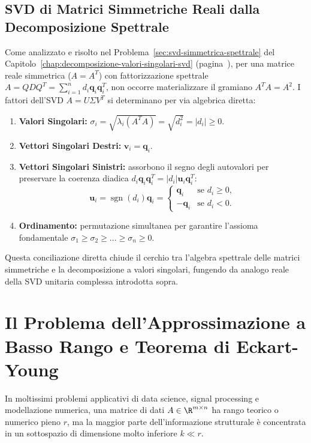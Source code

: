 \subsection{SVD di Matrici Simmetriche Reali dalla Decomposizione Spettrale}
\label{sec:svd-simmetriche-recap}

Come analizzato e risolto nel Problema~\ref{sec:svd-simmetrica-spettrale} del Capitolo~\ref{chap:decomposizione-valori-singolari-svd} (pagina~\pageref{sec:svd-simmetrica-spettrale}), per una matrice reale simmetrica ($A = A^T$) con fattorizzazione spettrale $A = Q D Q^T = \sum_{i=1}^n d_i \mathbf{q}_i \mathbf{q}_i^T$, non occorre materializzare il gramiano $A^T A = A^2$. I fattori dell'SVD $A = U \Sigma V^T$ si determinano per via algebrica diretta:
\begin{enumerate}
    \item \textbf{Valori Singolari:} $\sigma_i = \sqrt{\lambda_i(A^T A)} = \sqrt{d_i^2} = |d_i| \ge 0$.
    \item \textbf{Vettori Singolari Destri:} $\mathbf{v}_i = \mathbf{q}_i$.
    \item \textbf{Vettori Singolari Sinistri:} assorbono il segno degli autovalori per preservare la coerenza diadica $d_i \mathbf{q}_i \mathbf{q}_i^T = |d_i| \mathbf{u}_i \mathbf{q}_i^T$:
    \begin{equation}
        \mathbf{u}_i = \operatorname{sgn}(d_i) \mathbf{q}_i = \begin{cases} \mathbf{q}_i & \text{se } d_i \ge 0, \\ -\mathbf{q}_i & \text{se } d_i < 0. \end{cases}
    \end{equation}
    \item \textbf{Ordinamento:} permutazione simultanea per garantire l'assioma fondamentale $\sigma_1 \ge \sigma_2 \ge \dots \ge \sigma_n \ge 0$.
\end{enumerate}
Questa conciliazione diretta chiude il cerchio tra l'algebra spettrale delle matrici simmetriche e la decomposizione a valori singolari, fungendo da analogo reale della SVD unitaria complessa introdotta sopra.

\FloatBarrier
\section{Il Problema dell'Approssimazione a Basso Rango e Teorema di Eckart-Young}
\label{sec:eckart-young-teorema}

In moltissimi problemi applicativi di data science, signal processing e modellazione numerica, una matrice di dati $A \in \R^{m \times n}$ ha rango teorico o numerico pieno $r$, ma la maggior parte dell'informazione strutturale \`e concentrata in un sottospazio di dimensione molto inferiore $k \ll r$.

